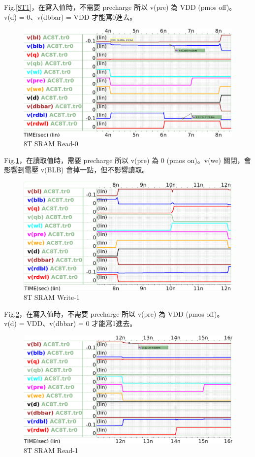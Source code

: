 \documentclass{article}
\begin{document}
Fig.\ref{8T1}，在寫入值時，不需要 precharge 所以 v(pre) 為 VDD (pmos off)。\\v(d) = 0、v(dbbar) = VDD 才能寫0進去。

\begin{figure}[H]
\centering
\includegraphics[width=0.7\linewidth]{./img/2023-11-16-13-34-20.png}
\caption{8T SRAM Read-0}
\label{8T2}
\end{figure}

Fig.\ref{8T2}，在讀取值時，需要 precharge 所以 v(pre) 為 0 (pmos on)。v(we) 關閉，會影響到電壓 v(BLB) 會掉一點，但不影響讀取。

\begin{figure}[H]
\centering
\includegraphics[width=0.7\linewidth]{./img/2023-11-16-13-36-04.png}
\caption{8T SRAM Write-1}
\label{8T3}
\end{figure}

Fig.\ref{8T3}，在寫入值時，不需要 precharge 所以 v(pre) 為 VDD (pmos off)。\\v(d) = VDD、v(dbbar) = 0 才能寫1進去。

\begin{figure}[H]
\centering
\includegraphics[width=0.7\linewidth]{./img/2023-11-16-13-37-07.png}
\caption{8T SRAM Read-1}
\label{8T4}
\end{figure}
\end{document}
